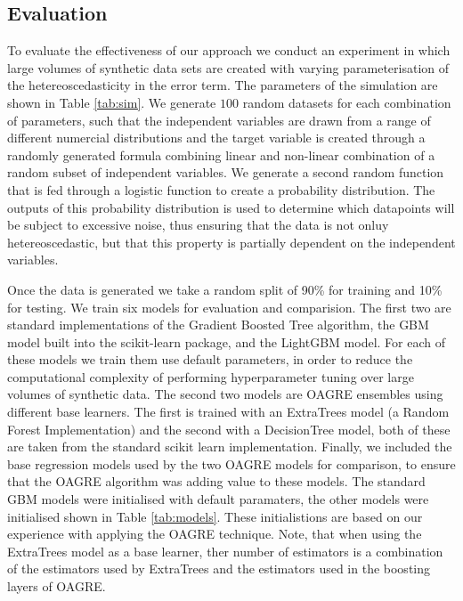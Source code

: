 \documentclass[12pt,a4paper]{article}
\begin{document}
 
\subsection{Evaluation}

To evaluate the effectiveness of our approach we conduct an experiment in which large volumes of synthetic data
sets are created with varying parameterisation of the hetereoscedasticity in the error term. The parameters of
the simulation are shown in Table \ref{tab:sim}. We generate $100$ random datasets for each combination of 
parameters, such that the independent variables are drawn from a range of different numercial distributions
and the target variable is created through a randomly generated formula combining linear and non-linear 
combination of a random subset of independent variables. We generate a second random function that is fed
through a logistic function to create a probability distribution. The outputs of this probability distribution
is used to determine which datapoints will be subject to excessive noise, thus ensuring that the data is
not onluy hetereoscedastic, but that this property is partially dependent on the independent variables.

Once the data is generated we take a random split of 90\% for training and 10\% for testing. 
We train six models for evaluation and comparision. The first two are standard implementations of
the Gradient Boosted Tree algorithm, the GBM model built into the scikit-learn package, and
the LightGBM model\cite{Ke2017}. For each of these models we train them use default parameters,
in order to reduce the computational complexity of performing hyperparameter tuning over large volumes of synthetic
data. The second two models are OAGRE ensembles using different base learners. The first is trained with an 
ExtraTrees model (a Random Forest Implementation) and the second with a DecisionTree model, both of these are
taken from the standard scikit learn implementation. Finally, we included the base regression models used
by the two OAGRE models for comparison, to ensure that the OAGRE algorithm was adding value to these models.
The standard GBM models were initialised with default paramaters, the other models were initialised shown in 
Table \ref{tab:models}. These initialistions are based on our experience with applying the OAGRE technique.
Note, that when using the ExtraTrees model as a base learner, ther number of estimators is a combination of
the estimators used by ExtraTrees and the estimators used in the boosting layers of OAGRE.
\end{document}
